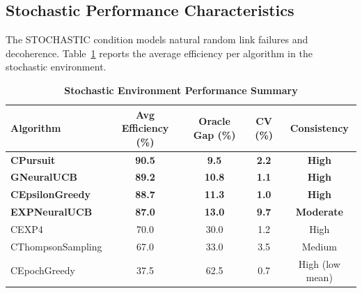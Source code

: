\documentclass[12pt,a4paper]{article}
\newcommand{\performance}[1]{\textcolor{performancecolor}{\textbf{#1}}}
\newcommand{\stochastic}[1]{\textcolor{stochasticcolor}{\textbf{#1}}}
\newcommand{\legacy}[1]{\textcolor{legacycolor}{\textbf{#1}}}
\newcommand{\neural}[1]{\textcolor{neuralcolor}{\textbf{#1}}}
\begin{document}
\begin{tcolorbox}[colback=stochasticcolor!10,colframe=stochasticcolor,title=\textbf{Stochastic Environment Deep Analysis (1$\times$–2$\times$ Capacities, T/Tb Combined)}]

\subsection{Stochastic Performance Characteristics}

The STOCHASTIC condition models natural random link failures and decoherence. Table~\ref{tab:stoch-performance} reports the average efficiency per algorithm in the stochastic environment.

\begin{table}[H]
\centering
\caption{\stochastic{Stochastic Environment Performance Summary}}
\label{tab:stoch-performance}
\begin{tabular}{|l|c|c|c|c|}
\hline
\textbf{Algorithm} & \textbf{Avg Efficiency (\%)} & \textbf{Oracle Gap (\%)} & \textbf{CV (\%)} & \textbf{Consistency} \\
\hline
\hline
\stochastic{CPursuit}        & \stochastic{90.5} & \stochastic{9.5}  & \stochastic{2.2} & \stochastic{High} \\
\neural{GNeuralUCB}          & \neural{89.2} & \neural{10.8}     & \neural{1.1} & \neural{High} \\
\performance{CEpsilonGreedy} & \performance{88.7}                        & \performance{11.3} & \performance{1.0} & \performance{High} \\
\legacy{EXPNeuralUCB}        & \legacy{87.0}               & \legacy{13.0}     & \legacy{9.7}     & \legacy{Moderate} \\
CEXP4                        & 70.0                        & 30.0              & 1.2              & High \\
CThompsonSampling            & 67.0                        & 33.0              & 3.5              & Medium \\
CEpochGreedy                 & 37.5                        & 62.5              & 0.7              & High (low mean) \\
\hline
\end{tabular}
\end{table}


\end{tcolorbox}
\end{document}
